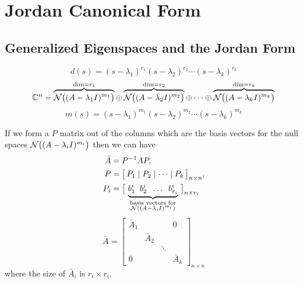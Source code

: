 \section{Jordan Canonical Form}\label{sec:jordan}
\subsection{Generalized Eigenspaces and the Jordan Form}\label{ss:gen-eigenspaces}
\begin{theorem}
\leavevmode{}%
\[ d(s)=(s-\lambda_1)^{r_1}(s-\lambda_2)^{r_2}\cdots(s-\lambda_k)^{r_k} \]
\[
\mathbb{C}^n=\overbrace{\mathcal{N}\big((A-\lambda_1I)^{m_1}\big)}^{\dim=r_1}\oplus\overbrace{\mathcal{N}\big((A-\lambda_2I)^{m_2}\big)}^{\dim=r_2}\oplus\cdots\oplus\overbrace{\mathcal{N}\big((A-\lambda_kI)^{m_k}\big)}^{\dim=r_k}
\]
\[ m(s)=(s-\lambda_1)^{m_1}(s-\lambda_2)^{m_2}\cdots(s-\lambda_k)^{m_k} \]
\end{theorem}

\point If we form a $P$ matrix out of the columns which are the basis vectors for the null spaces $\mathcal{N}\big((A-\lambda_iI)^{m_i}\big)$ then we can have
\begin{align*}
\bar A&=P^{-1}AP,\\
P&=\big[\,P_1\mid P_2\mid\dots\mid P_k\,\big]_{n\times n},\\
P_i&=\big[\,\underbrace{b_1^i\;\; b_2^i\;\;\dots\;\; b_{r_i}^i}_{\substack{\text{basis vectors for}\\ \mathcal{N}((A-\lambda_iI)^{m_i})}}\,\big]_{n\times r_i}
\end{align*}
\[
\bar A=\begin{bmatrix}\bar A_1 & & & 0\\ & \bar A_2 & & \\ & & \ddots & \\ 0 & & & \bar A_k\end{bmatrix}_{n\times n}
\]
where the size of $\bar A_i$ is $r_i\times r_i$.

